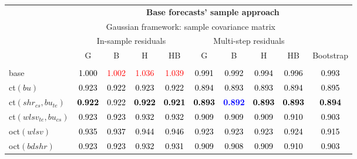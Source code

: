 
\begin{tabular}[t]{>{\centering\arraybackslash}m{2.5cm}ccccccccc}
\toprule
\multicolumn{1}{c}{\textbf{}} & \multicolumn{9}{c}{\textbf{Base forecasts' sample approach}} \\
\cmidrule(l{0pt}r{0pt}){2-10}
\multicolumn{1}{c}{} & \multicolumn{8}{c}{Gaussian framework: sample covariance matrix} & \multicolumn{1}{c}{} \\
\multicolumn{1}{c}{} & \multicolumn{4}{c}{In-sample residuals} & \multicolumn{4}{c}{Multi-step residuals} & \multicolumn{1}{c}{} \\
\multirow{-5}{*}{\parbox{2cm}{\centering\textbf{Reconciliation\\approach}}} & G & B & H & HB & G & B & H & HB & \multirow{-4}{*}{Bootstrap}\\
\midrule
\addlinespace[0.3em]
\multicolumn{10}{c}{\textbf{$\forall k \in \{2,1\}$}}\\
base & \textcolor{black}{1.000} & \textcolor{red}{1.002} & \textcolor{red}{1.036} & \textcolor{red}{1.039} & \textcolor{black}{0.991} & \textcolor{black}{0.992} & \textcolor{black}{0.994} & \textcolor{black}{0.996} & \textcolor{black}{0.993}\\
ct$(bu)$ & \textcolor{black}{0.923} & \textcolor{black}{0.922} & \textcolor{black}{0.923} & \textcolor{black}{0.922} & \textcolor{black}{0.894} & \textcolor{black}{0.893} & \textcolor{black}{0.893} & \textcolor{black}{0.894} & \textcolor{black}{0.895}\\
ct$(shr_{cs}, bu_{te})$ & \textcolor{black}{\textbf{0.922}} & \textcolor{black}{0.922} & \textcolor{black}{\textbf{0.922}} & \textcolor{black}{\textbf{0.921}} & \textcolor{black}{\textbf{0.893}} & \textcolor{blue}{\textbf{0.892}} & \textcolor{black}{\textbf{0.893}} & \textcolor{black}{\textbf{0.893}} & \textcolor{black}{\textbf{0.894}}\\
ct$(wlsv_{te}, bu_{cs})$ & \textcolor{black}{0.923} & \textcolor{black}{0.923} & \textcolor{black}{0.932} & \textcolor{black}{0.932} & \textcolor{black}{0.909} & \textcolor{black}{0.909} & \textcolor{black}{0.909} & \textcolor{black}{0.910} & \textcolor{black}{0.903}\\
oct$(wlsv)$ & \textcolor{black}{0.935} & \textcolor{black}{0.937} & \textcolor{black}{0.944} & \textcolor{black}{0.946} & \textcolor{black}{0.923} & \textcolor{black}{0.923} & \textcolor{black}{0.923} & \textcolor{black}{0.924} & \textcolor{black}{0.915}\\
oct$(bdshr)$ & \textcolor{black}{0.923} & \textcolor{black}{0.923} & \textcolor{black}{0.932} & \textcolor{black}{0.931} & \textcolor{black}{0.909} & \textcolor{black}{0.908} & \textcolor{black}{0.909} & \textcolor{black}{0.910} & \textcolor{black}{0.903}\\

\end{tabular}
